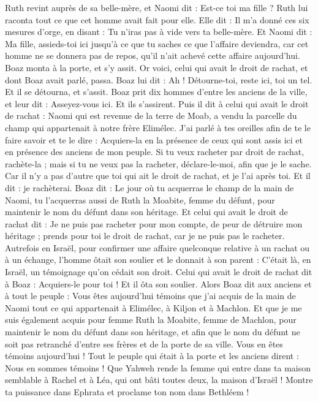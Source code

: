 \begin{multicols}{2}
Ruth revint auprès de sa belle-mère, et Naomi dit : Est-ce toi ma fille ? Ruth lui raconta tout ce que cet homme avait fait pour elle.
Elle dit : Il m'a donné ces six mesures d'orge, en disant : Tu n'iras pas à vide vers ta belle-mère.
Et Naomi dit : Ma fille, assieds-toi ici jusqu'à ce que tu saches ce que l'affaire deviendra, car cet homme ne se donnera pas de repos, qu'il n'ait achevé cette affaire aujourd'hui.
\VerseOne{}Boaz monta à la porte, et s'y assit. Or voici, celui qui avait le droit de rachat, et dont Boaz avait parlé, passa. Boaz lui dit : Ah ! Détourne-toi, reste ici, toi un tel. Et il se détourna, et s'assit.
Boaz prit dix hommes d'entre les anciens de la ville, et leur dit : Asseyez-vous ici. Et ils s'assirent.
Puis il dit à celui qui avait le droit de rachat : Naomi qui est revenue de la terre de Moab, a vendu la parcelle du champ qui appartenait à notre frère Elimélec.
J'ai parlé à tes oreilles afin de te le faire savoir et te le dire : Acquiers-la en la présence de ceux qui sont assis ici et en présence des anciens de mon peuple. Si tu veux racheter par droit de rachat, rachète-la ; mais si tu ne veux pas la racheter, déclare-le-moi, afin que je le sache. Car il n'y a pas d'autre que toi qui ait le droit de rachat, et je l'ai après toi. Et il dit : je rachèterai.
Boaz dit : Le jour où tu acquerras le champ de la main de Naomi, tu l'acquerras aussi de Ruth la Moabite, femme du défunt, pour maintenir le nom du défunt dans son héritage.
Et celui qui avait le droit de rachat dit : Je ne puis pas racheter pour mon compte, de peur de détruire mon héritage ; prends pour toi le droit de rachat, car je ne puis pas le racheter.
Autrefois en Israël, pour confirmer une affaire quelconque relative à un rachat ou à un échange, l'homme ôtait son soulier et le donnait à son parent : C'était là, en Israël, un témoignage qu'on cédait son droit.
Celui qui avait le droit de rachat dit à Boaz : Acquiers-le pour toi ! Et il ôta son soulier.
Alors Boaz dit aux anciens et à tout le peuple : Vous êtes aujourd'hui témoins que j'ai acquis de la main de Naomi tout ce qui appartenait à Elimélec, à Kiljon et à Machlon.
Et que je me suis également acquis pour femme Ruth la Moabite, femme de Machlon, pour maintenir le nom du défunt dans son héritage, et afin que le nom du défunt ne soit pas retranché d'entre ses frères et de la porte de sa ville. Vous en êtes témoins aujourd'hui !
Tout le peuple qui était à la porte et les anciens dirent : Nous en sommes témoins ! Que Yahweh rende la femme qui entre dans ta maison semblable à Rachel et à Léa, qui ont bâti toutes deux, la maison d'Israël ! Montre ta puissance dans Ephrata et proclame ton nom dans Bethléem !

\end{multicols}
